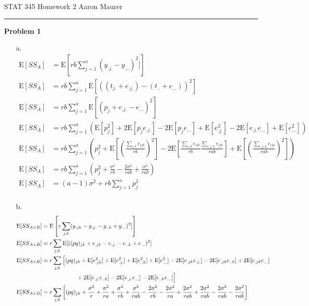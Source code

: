 \documentclass[11pt]{article}
\newcommand{\E}{\mathrm{E}}
\theoremstyle{definition}
\begin{document}
STAT 345 Homework 2 \hfill Aaron Maurer
\vspace{2mm}
\hrule
\vspace{2mm}
{\bf Problem 1}

\begin{itemize}
    \item[a.]
        \begin{align*}
            \E[SS_A] &= \E\left[rb\sum_{j=1}^a (y_{.j.}-y_{...})^2]\right] \\
            \E[SS_A] &= rb\sum_{j=1}^a \E[((t_{j.}+e_{.j.})-(t_{..}+e_{...}))^2] \\
            \E[SS_A] &= rb\sum_{j=1}^a \E[(p_j+e_{.j.}-e_{...})^2] \\
            \E[SS_A] &= rb\sum_{j=1}^a \left( \E[p_j^2] + 2\E[p_je_{.j.}]-2\E[p_je_{...}] + \E[e_{.j.}^2]- 2\E[e_{.j.}e_{...}]+ \E[e_{...}^2] \right) \\
            \E[SS_A] &= rb\sum_{j=1}^a \left(p_j^2 + \E\left[\left(\frac{\sum_{i,k}e_{ijk}}{rb}\right)^2\right]- 2\E\left[\frac{\sum_{i,k}e_{ijk}}{rb}\frac{\sum_{i,j,k}e_{ijk}}{rab}\right]+ \E\left[\left(\frac{\sum_{i,j,k}e_{ijk}}{rab}\right)^2\right] \right) \\
            \E[SS_A] &= rb\sum_{j=1}^a \left(p_j^2 + \frac{\sigma^2}{rb} - \frac{2\sigma^2}{rab} + \frac{\sigma^2}{rab}\right) \\
            \E[SS_A] &= (a-1)\sigma^2 + rb\sum_{j=1}^a p_j^2\\
        \end{align*}
    \item[b.]
        \begin{align*}
            \E[SS_{A\times B}] &= \E\left[r\sum_{j,k} (y_{.jk}-y_{.j.}-y_{..k}+y_{...})^2]\right] \\
            \E[SS_{A\times B}] &= r\sum_{j,k} \E[((pq)_{jk}+e_{.jk}-e_{.j.}-e_{..k}+e_{...})^2] \\
            \E[SS_{A\times B}] &= r\sum_{j,k} \Big[(pq)_{jk}+\E[e_{.jk}^2]+\E[e_{.j.}^2]+\E[e_{..k}^2]+\E[e_{...}^2]-2\E[e_{.jk}e_{.j.}]-2\E[e_{.jk}e_{..k}]+2\E[e_{.jk}e_{...}] \\
                               & \hskip 6em +2\E[e_{.j.}e_{..k}]-2\E[e_{.j.}e_{...}] -2\E[e_{..k}e_{...}] \Big] \\
            \E[SS_{A\times B}] &= r\sum_{j,k} \left[(pq)_{jk} + \frac{\sigma^2}{r} + \frac{\sigma^2}{ra} + \frac{\sigma^2}{rb} + \frac{\sigma^2}{rab} - \frac{2\sigma^2}{rb} - \frac{2\sigma^2}{ra} + \frac{2\sigma^2}{rab} + \frac{2\sigma^2}{rab} - \frac{2\sigma^2}{rab} -  \frac{2\sigma^2}{rab} \right] \\  

\end{align*}
\end{itemize}
\end{document}
